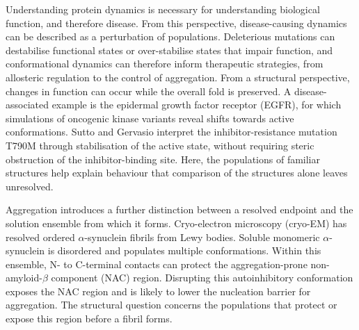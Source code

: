 Understanding protein dynamics is necessary for understanding biological function, and therefore disease. From this perspective, disease-causing dynamics can be described as a perturbation of populations. Deleterious mutations can destabilise functional states or over-stabilise states that impair function,\supercite{parraFrustrationPhysiologyMolecular2025,suttoEffectsOncogenicMutations2013} and conformational dynamics can therefore inform therapeutic strategies, from allosteric regulation to the control of aggregation.\supercite{lisiAllosteryEnzymeCatalysis2017,mukherjeeProteinMisfoldingAmyloid2024} From a structural perspective, changes in function can occur while the overall fold is preserved. A disease-associated example is the epidermal growth factor receptor (EGFR), for which simulations of oncogenic kinase variants reveal shifts towards active conformations. Sutto and Gervasio interpret the inhibitor-resistance mutation T790M through stabilisation of the active state, without requiring steric obstruction of the inhibitor-binding site.\supercite{suttoEffectsOncogenicMutations2013} Here, the populations of familiar structures help explain behaviour that comparison of the structures alone leaves unresolved.

Aggregation introduces a further distinction between a resolved endpoint and the solution ensemble from which it forms. Cryo-electron microscopy (cryo-EM) has resolved ordered $\alpha$-synuclein fibrils from Lewy bodies.\supercite{yanCryoEMStructuresInfectious2026,dhavaleStructureAlphasynucleinFibrils2024} Soluble monomeric $\alpha$-synuclein is disordered and populates multiple conformations.\supercite{ahmedRefinementASynucleinEnsembles2021} Within this ensemble, N- to C-terminal contacts can protect the aggregation-prone non-amyloid-$\beta$ component (NAC) region. Disrupting this autoinhibitory conformation exposes the NAC region and is likely to lower the nucleation barrier for aggregation.\supercite{mukherjeeProteinMisfoldingAmyloid2024} The structural question concerns the populations that protect or expose this region before a fibril forms.

